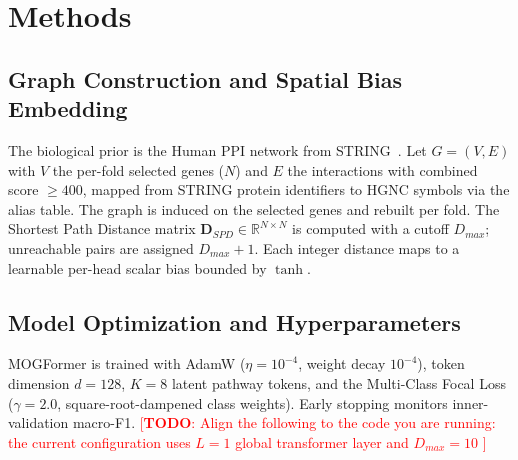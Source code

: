 \documentclass[10pt, twocolumn]{article}
\newcommand{\todo}[1]{\textcolor{red}{[\textbf{TODO}: #1]}}
\begin{document}
\section*{Methods}

\subsection*{Graph Construction and Spatial Bias Embedding}
The biological prior is the Human PPI network from STRING~\cite{szklarczyk2023string}.
Let $G=(V,E)$ with $V$ the per-fold selected genes ($N$) and $E$ the interactions
with combined score $\geq 400$, mapped from STRING protein identifiers to HGNC
symbols via the alias table. The graph is induced on the selected genes and rebuilt
per fold. The Shortest Path Distance matrix $\mathbf{D}_{SPD} \in \mathbb{R}^{N
\times N}$ is computed with a cutoff $D_{max}$; unreachable pairs are assigned
$D_{max}+1$. Each integer distance maps to a learnable per-head scalar bias bounded
by $\tanh$.

\subsection*{Model Optimization and Hyperparameters}
MOGFormer is trained with AdamW ($\eta = 10^{-4}$, weight decay $10^{-4}$), token
dimension $d=128$, $K=8$ latent pathway tokens, and the Multi-Class Focal Loss
($\gamma=2.0$, square-root-dampened class weights). Early stopping monitors inner-
validation macro-F1. \todo{Align the following to the code you are running: the
current configuration uses $L=1$ global transformer layer and $D_{max}=10$ }
\end{document}
